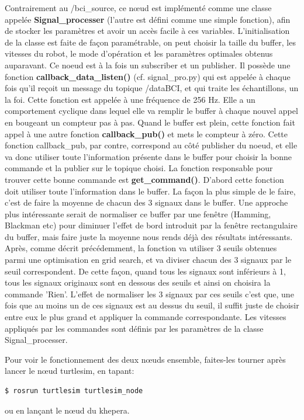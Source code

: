 Contrairement au /bci\_source, ce nœud est implémenté comme une classe appelée \textbf{Signal\_processer} (l'autre est défini comme une simple fonction), afin de stocker les paramètres et avoir un accès facile à ces variables. L'initialisation de la classe est faite de façon paramétrable, on peut choisir la taille du buffer, les vitesses du robot, le mode d'opération et les paramètres optimales obtenus auparavant. Ce noeud est à la fois un subscriber et un publisher. Il possède une fonction \textbf{callback\_data\_listen()} (cf. signal\_pro.py) qui est appelée à chaque fois qu'il reçoit un message du topique /dataBCI, et qui traite les échantillons, un la foi. Cette fonction est appelée à une fréquence de 256 Hz. Elle a un comportement cyclique dans lequel elle va remplir le buffer à chaque nouvel appel en bougeant un compteur pas à pas. Quand le buffer est plein, cette fonction fait appel à une autre fonction \textbf{callback\_pub()} et mets le compteur à zéro. Cette fonction callback\_pub, par contre, correspond au côté publisher du noeud, et elle va donc utiliser toute l'information présente dans le buffer pour choisir la bonne commande et la publier sur le topique choisi. La fonction responsable pour trouver cette bonne commande est \textbf{get\_command()}. D'abord cette fonction doit utiliser toute l'information dans le buffer. La façon la plus simple de le faire, c'est de faire la moyenne de chacun des 3 signaux dans le buffer. Une approche plus intéressante serait de normaliser ce buffer par une fenêtre (Hamming, Blackman etc) pour diminuer l'effet de bord introduit par la fenêtre rectangulaire du buffer, mais faire juste la moyenne nous rends déjà des résultats intéressants. Après, comme décrit précédemment, la fonction va utiliser 3 seuils obtenues parmi une optimisation en grid search, et va diviser chacun des 3 signaux par le seuil correspondent. De cette façon, quand tous les signaux sont inférieurs à 1, tous les signaux originaux sont en dessous des seuils et ainsi on choisira la commande 'Rien'. L'effet de normaliser les 3 signaux par ces seuils c'est que, une fois que au moins un de ces signaux est au dessus du seuil, il suffit juste de choisir entre eux le plus grand et appliquer la commande correspondante. Les vitesses appliqués par les commandes sont définis par les paramètres de la classe Signal\_processer.   

Pour voir le fonctionnement des deux nœuds ensemble, faites-les tourner après lancer le nœud turtlesim, en tapant:
\begin{lstlisting}[language=bash]
  $ rosrun turtlesim turtlesim_node
\end{lstlisting}

ou en lançant le nœud du khepera.
